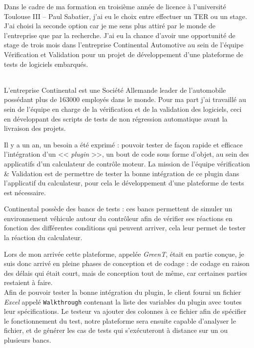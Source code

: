 \documentclass[a4paper, 12pt]{article}
\begin{document}
	\maketitle
	Dans le cadre de ma formation en troisième année de licence à l'université Toulouse III -- Paul Sabatier, j'ai eu le choix entre effectuer un TER ou un
	stage.  J'ai choisi la seconde option car je me sens plus attiré par le monde de l'entreprise que par la recherche. J'ai eu la chance d’avoir une opportunité de stage de trois mois dans l'entreprise Continental Automotive au sein de l'équipe Vérification et Validation pour un projet de développement
	d'une plateforme de tests de logiciels embarqués.\\~

	L'entreprise Continental est une Société Allemande leader de l'automobile possédant plus de 163000 employés dans le monde. Pour ma part j'ai travaillé au
	sein de l'équipe en charge de la vérification et de la validation des logiciels, ceci en développant des scripts de tests de non régression automatique avant la
	livraison des projets.

	Il y a un an, un besoin a été exprimé : pouvoir tester de façon rapide et efficace l'intégration d'un << \textit{plugin} >>, un bout de code sous forme
	d'objet,  au sein des applicatifs d'un calculateur de contrôle moteur. La mission de l'équipe vérification \& Validation est de permettre de tester la bonne intégration
	de ce plugin dans l'applicatif du calculateur, pour cela le développement d'une plateforme de tests est nécessaire.

	Continental possède des bancs de tests : ces bancs permettent de simuler un environnement véhicule autour du
	contrôleur afin de vérifier ses réactions en fonction des différentes conditions qui peuvent arriver, cela leur permet de tester la réaction du calculateur.

	Lors de mon arrivée cette plateforme, appelée \textit{GreenT}, était en partie conçue, je suis donc arrivé en pleine phases de conception et de codage : de
	codage en raison des délais qui était court, mais de conception tout de même, car certaines parties restaient à faire.\\
	Afin de pouvoir tester la bonne intégration du plugin, le client fourni un fichier \textit{Excel} appelé \texttt{Walkthrough} contenant la liste des variables du plugin avec
toutes leur spécifications. Le testeur va ajouter des colonnes à ce fichier afin de spécifier le fonctionnement du test, notre plateforme sera ensuite
	capable d'analyser le fichier, et de générer les cas de tests qui s'exécuteront à distance sur un ou plusieurs bancs.
\end{document}
